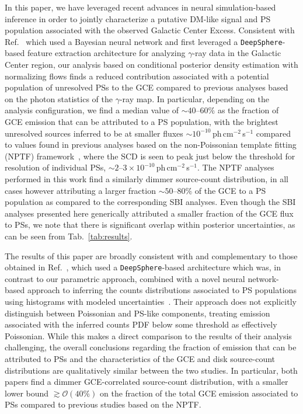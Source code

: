 \documentclass[prd,aps,10pt,nofootinbib,twocolumn,superscriptaddress,preprintnumbers,balancelastpage,longbibliography]{revtex4-1}
\begin{document}
In this paper, we have leveraged recent advances in neural simulation-based inference in order to jointly characterize a putative DM-like signal and PS population associated with the observed \Fermi Galactic Center Excess. Consistent with Ref.~\cite{List:2020mzd} which used a Bayesian neural network and first leveraged a \texttt{DeepSphere}-based feature extraction architecture for analyzing $\gamma$-ray data in the Galactic Center region, our analysis based on conditional posterior density estimation with normalizing flows finds a reduced contribution associated with a potential population of unresolved PSs to the GCE compared to previous analyses based on the photon statistics of the $\gamma$-ray map. In particular, depending on the analysis configuration, we find a median value of $\sim40$--$60\%$ as the fraction of GCE emission that can be attributed to a PS population, with the brightest unresolved sources inferred to be at smaller fluxes $\sim 10^{-10}$\,ph\,cm$^{-2}$\,s$^{-1}$ compared to values found in previous analyses based on the non-Poissonian template fitting (NPTF) framework~\cite{Lee:2015fea}, where the SCD is seen to peak just below the threshold for resolution of individual PSs, $\sim 2$--$3\times 10^{-10}$\,ph\,cm$^{-2}$\,s$^{-1}$. The NPTF analyses performed in this work find a similarly dimmer source-count distribution, in all cases however attributing a larger fraction $\sim50$--$80\%$ of the GCE to a PS population as compared to the corresponding SBI analyses. Even though the SBI analyses presented here generically attributed a smaller fraction of the GCE flux to PSs, we note that there is significant overlap within posterior uncertainties, as can be seen from Tab.~\ref{tab:results}.

The results of this paper are broadly consistent with and complementary to those obtained in Ref.~\cite{List:2021aer}, which used a \texttt{DeepSphere}-based architecture which was, in contrast to our parametric approach, combined with a novel neural network-based approach to inferring the counts distributions associated to PS populations using histograms with modeled uncertainties~\cite{list2021earth}. Their approach does not explicitly distinguish between Poissonian and PS-like components, treating emission associated with the inferred counts PDF below some threshold as effectively Poissonian. While this makes a direct comparison to the results of their analysis challenging, the overall conclusions regarding the fraction of emission that can be attributed to PSs and the characteristics of the GCE and disk source-count distributions are qualitatively similar between the two studies. In particular, both papers find a dimmer GCE-correlated source-count distribution, with a smaller lower bound $\gtrsim \mathcal O(40\%)$ on the fraction of the total GCE emission associated to PSs compared to previous studies based on the NPTF.
\end{document}
